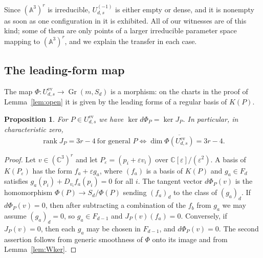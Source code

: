\documentclass{amsart}
\newtheorem{proposition}[theorem]{Proposition}
\theoremstyle{definition}
\theoremstyle{remark}
\numberwithin{equation}{section}
\newcommand{\CC}{\mathbb{C}}
\newcommand{\A}{\mathbb{A}}
\DeclareMathOperator{\Gr}{Gr}
\DeclareMathOperator{\rank}{rank}
\begin{document}
Since $(\A^3)^r$ is irreducible, $U^{(-1)}_{d,s}$ is either empty or dense, and it is
nonempty as soon as one configuration in it is exhibited. All of our witnesses are
of this kind; some of them are only points of a larger irreducible parameter space
mapping to $(\A^3)^r$, and we explain the transfer in each case.

\subsection{The leading-form map}
The map $\Phi\colon U^{\mathrm{ev}}_{d,s}\to\Gr(m,S_d)$ is a morphism: on the charts in
the proof of Lemma~\ref{lem:open} it is given by the leading forms of a regular
basis of $K(P)$.

\begin{proposition}\label{prop:leading}
For $P\in U^{\mathrm{ev}}_{d,s}$ we have $\ker d\Phi_P=\ker J_P$. In particular,
in characteristic zero,
\[
  \rank J_P=3r-4\ \text{for general }P\iff
  \dim\overline{\Phi(U^{\mathrm{ev}}_{d,s})}=3r-4 .
\]
\end{proposition}

\begin{proof}
Let $v\in(\CC^3)^r$ and let $P_\varepsilon=(p_i+\varepsilon v_i)$ over
$\CC[\varepsilon]/(\varepsilon^2)$. A basis of $K(P_\varepsilon)$ has the form
$f_a+\varepsilon g_a$, where $(f_a)$ is a basis of $K(P)$ and $g_a\in F_d$ satisfies
$g_a(p_i)+D_{v_i}f_a(p_i)=0$ for all $i$. The tangent vector $d\Phi_P(v)$ is the
homomorphism $\Phi(P)\to S_d/\Phi(P)$ sending $(f_a)_d$ to the class of $(g_a)_d$.
If $d\Phi_P(v)=0$, then after subtracting a combination of the $f_b$ from $g_a$ we
may assume $(g_a)_d=0$, so $g_a\in F_{d-1}$ and $J_P(v)(f_a)=0$. Conversely, if
$J_P(v)=0$, then each $g_a$ may be chosen in $F_{d-1}$, and
$d\Phi_P(v)=0$. The second assertion follows from generic smoothness of $\Phi$
onto its image and from Lemma~\ref{lem:Wker}.
\end{proof}
\end{document}
